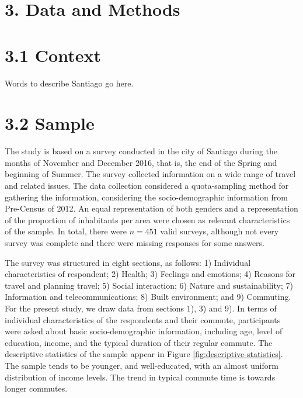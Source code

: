 \documentclass[]{elsarticle} %
\begin{document}
\hypertarget{data-and-methods}{%
\section{3. Data and Methods}\label{data-and-methods}}

\hypertarget{context}{%
\section{3.1 Context}\label{context}}

Words to describe Santiago go here.

\hypertarget{sample}{%
\section{3.2 Sample}\label{sample}}

The study is based on a survey conducted in the city of Santiago during
the months of November and December 2016, that is, the end of the Spring
and beginning of Summer. The survey collected information on a wide
range of travel and related issues. The data collection considered a
quota-sampling method for gathering the information, considering the
socio-demographic information from Pre-Census of 2012. An equal
representation of both genders and a representation of the proportion of
inhabitants per area were chosen as relevant characteristics of the
sample. In total, there were \(n=451\) valid surveys, although not every
survey was complete and there were missing responses for some answers.

The survey was structured in eight sections, as follows: 1) Individual
characteristics of respondent; 2) Health; 3) Feelings and emotions; 4)
Reasons for travel and planning travel; 5) Social interaction; 6) Nature
and sustainability; 7) Information and telecommunications; 8) Built
environment; and 9) Commuting. For the present study, we draw data from
sections 1), 3) and 9). In terms of individual characteristics of the
respondents and their commute, participants were asked about basic
socio-demographic information, including age, level of education,
income, and the typical duration of their regular commute. The
descriptive statistics of the sample appear in Figure
\ref{fig:descriptive-statistics}. The sample tends to be younger, and
well-educated, with an almost uniform distribution of income levels. The
trend in typical commute time is towards longer commutes.
\end{document}
